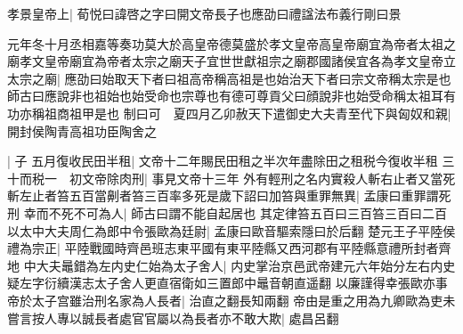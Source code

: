 孝景皇帝上|{
	荀悦曰諱啓之字曰開文帝長子也應劭曰禮諡法布義行剛曰景}


元年冬十月丞相嘉等奏功莫大於高皇帝德莫盛於孝文皇帝高皇帝廟宜為帝者太祖之廟孝文皇帝廟宜為帝者太宗之廟天子宜世世獻祖宗之廟郡國諸侯宜各為孝文皇帝立太宗之廟|{
	應劭曰始取天下者曰祖高帝稱高祖是也始治天下者曰宗文帝稱太宗是也師古曰應說非也祖始也始受命也宗尊也有德可尊貢父曰顔說非也始受命稱太祖耳有功亦稱祖商祖甲是也}
制曰可　夏四月乙卯赦天下遣御史大夫青至代下與匈奴和親|{
	開封侯陶青高祖功臣陶舍之}


|{
	子}
五月復收民田半租|{
	文帝十二年賜民田租之半次年盡除田之租税今復收半租}
三十而税一　初文帝除肉刑|{
	事見文帝十三年}
外有輕刑之名内實殺人斬右止者又當死斬左止者笞五百當劓者笞三百率多死是歲下詔曰加笞與重罪無異|{
	孟康曰重罪謂死刑}
幸而不死不可為人|{
	師古曰謂不能自起居也}
其定律笞五百曰三百笞三百曰二百以太中大夫周仁為郎中令張歐為廷尉|{
	孟康曰歐音驅索隱曰於后翻}
楚元王子平陸侯禮為宗正|{
	平陸戰國時齊邑班志東平國有東平陸縣又西河郡有平陸縣意禮所封者齊地}
中大夫鼂錯為左内史仁始為太子舍人|{
	内史掌治京邑武帝建元六年始分左右内史疑左字衍續漢志太子舍人更直宿衛如三置郎中鼂音朝直遥翻}
以廉謹得幸張歐亦事帝於太子宫雖治刑名家為人長者|{
	治直之翻長知兩翻}
帝由是重之用為九卿歐為吏未嘗言按人專以誠長者處官官屬以為長者亦不敢大欺|{
	處昌呂翻}


